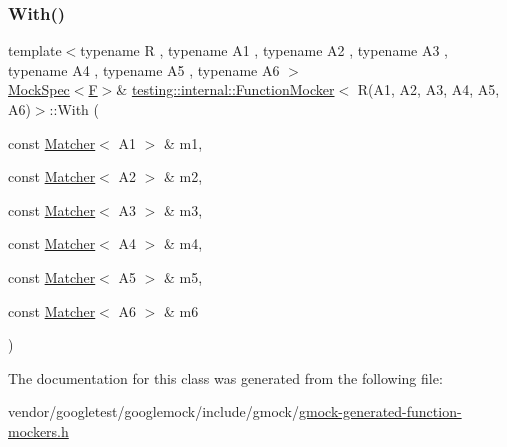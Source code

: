 \subsubsection{\texorpdfstring{With()}{With()}}
{\footnotesize\ttfamily template$<$typename R , typename A1 , typename A2 , typename A3 , typename A4 , typename A5 , typename A6 $>$ \\
\hyperlink{classtesting_1_1internal_1_1_mock_spec}{Mock\+Spec}$<$\hyperlink{classtesting_1_1internal_1_1_function_mocker_3_01_r_07_a1_00_01_a2_00_01_a3_00_01_a4_00_01_a5_00_01_a6_08_4_a5373cd66051f0a54e83b0497004df058}{F}$>$\& \hyperlink{classtesting_1_1internal_1_1_function_mocker}{testing\+::internal\+::\+Function\+Mocker}$<$ R(A1, A2, A3, A4, A5, A6)$>$\+::With (\begin{DoxyParamCaption}\item[{const \hyperlink{classtesting_1_1_matcher}{Matcher}$<$ A1 $>$ \&}]{m1,  }\item[{const \hyperlink{classtesting_1_1_matcher}{Matcher}$<$ A2 $>$ \&}]{m2,  }\item[{const \hyperlink{classtesting_1_1_matcher}{Matcher}$<$ A3 $>$ \&}]{m3,  }\item[{const \hyperlink{classtesting_1_1_matcher}{Matcher}$<$ A4 $>$ \&}]{m4,  }\item[{const \hyperlink{classtesting_1_1_matcher}{Matcher}$<$ A5 $>$ \&}]{m5,  }\item[{const \hyperlink{classtesting_1_1_matcher}{Matcher}$<$ A6 $>$ \&}]{m6 }\end{DoxyParamCaption})\hspace{0.3cm}{\ttfamily [inline]}}



The documentation for this class was generated from the following file\+:\begin{DoxyCompactItemize}
\item 
vendor/googletest/googlemock/include/gmock/\hyperlink{gmock-generated-function-mockers_8h}{gmock-\/generated-\/function-\/mockers.\+h}\end{DoxyCompactItemize}
